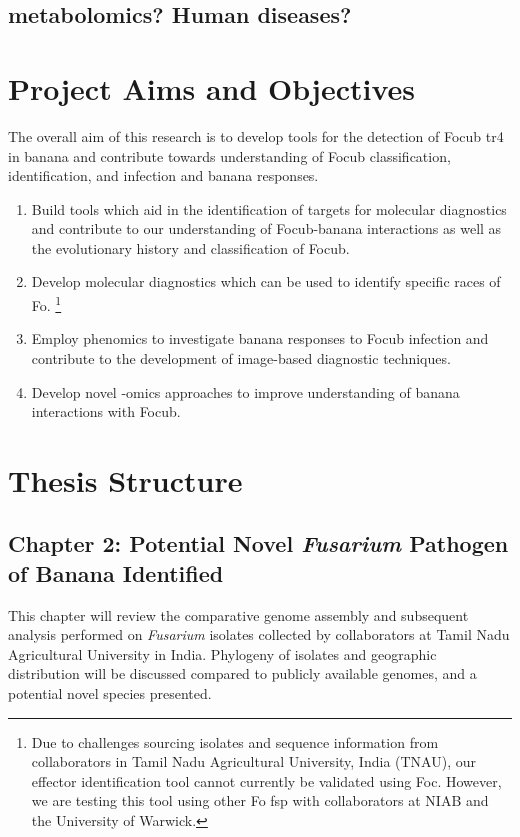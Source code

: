 \subsection{metabolomics? Human diseases?}


\newpage
\section{Project Aims and Objectives}

The overall aim of this research is to develop tools for the detection of \acl{Focub} \ac{tr4} in banana and contribute towards understanding of \acl{Focub} classification, identification, and infection and banana responses. 

\begin{enumerate}
    \item Build tools which aid in the identification of targets for molecular diagnostics and contribute to our understanding of \ac{Focub}-banana interactions as well as the evolutionary history and classification of \ac{Focub}. 
    \item Develop molecular diagnostics which can be used to identify specific races of \acl{Fo}. \footnote{Due to challenges sourcing isolates and sequence information from collaborators in Tamil Nadu Agricultural University, India (TNAU), our effector identification tool cannot currently be validated using Foc. However, we are testing this tool using other \acl{Fo} \ac{fsp} with collaborators at NIAB and the University of Warwick.}
    \item Employ phenomics to investigate banana responses to \ac{Focub} infection and contribute to the development of image-based diagnostic techniques.  
    \item Develop novel -omics approaches to improve understanding of banana interactions with \ac{Focub}.  
\end{enumerate}

\newpage
\section{Thesis Structure}

\subsection{Chapter 2: Potential Novel \textit{Fusarium} Pathogen of Banana Identified} 

This chapter will review the comparative genome assembly and subsequent analysis performed on \textit{Fusarium} isolates collected by collaborators at Tamil Nadu Agricultural University in India. Phylogeny of isolates and geographic distribution will be discussed compared to publicly available genomes, and a potential novel species presented. 

